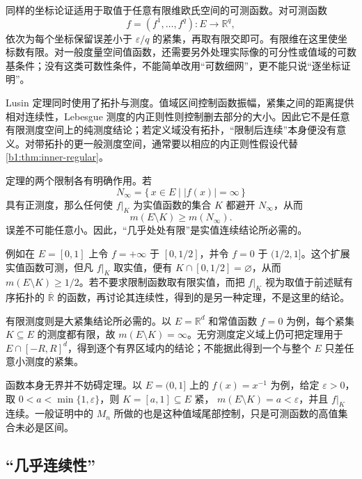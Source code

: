 同样的坐标论证适用于取值于任意有限维欧氏空间的可测函数。对可测函数
\[
  f=(f^1,\ldots,f^q):E\longrightarrow\mathbb R^q,
\]
依次为每个坐标保留误差小于
\(\varepsilon/q\) 的紧集，再取有限交即可。有限维在这里使坐标数有限。对一般度量空间值函数，还需要另外处理实际像的可分性或值域的可数基条件；没有这类可数性条件，不能简单改用“可数细网”，更不能只说“逐坐标证明”。

\ProseParagraphBreak

Lusin 定理同时使用了拓扑与测度。值域区间控制函数振幅，紧集之间的距离提供相对连续性，Lebesgue 测度的内正则性则控制删去部分的大小。因此它不是任意有限测度空间上的纯测度结论；若定义域没有拓扑，“限制后连续”本身便没有意义。对带拓扑的更一般测度空间，通常要以相应的内正则性假设代替%
\cref{b1:thm:inner-regular}。

\ProseParagraphBreak

定理的两个限制各有明确作用。若
\[
N_\infty=\{\,x\in E\mid |f(x)|=\infty\,\}
\]
具有正测度，那么任何使 \(f|_K\) 为实值函数的集合 \(K\) 都避开
\(N_\infty\)，从而
\[
m(E\setminus K)\geq m(N_\infty).
\]
误差不可能任意小。因此，“几乎处处有限”是实值连续结论所必需的。

\ProseParagraphBreak

例如在 \(E=[0,1]\) 上令 \(f=+\infty\) 于 \([0,1/2]\)，并令
\(f=0\) 于 \((1/2,1]\)。这个扩展实值函数可测，但凡
\(f|_K\) 取实值，便有 \(K\cap[0,1/2]=\varnothing\)，从而
\(m(E\setminus K)\geq1/2\)。若不要求限制函数取有限实值，而把
\(f|_K\) 视为取值于前述赋有序拓扑的 \(\overline{\mathbb R}\) 的函数，再讨论其连续性，得到的是另一种定理，不是这里的结论。

\ProseParagraphBreak

有限测度则是大紧集结论所必需的。以 \(E=\mathbb R^d\) 和常值函数
\(f=0\) 为例，每个紧集 \(K\subseteq E\) 的测度都有限，故
\(m(E\setminus K)=\infty\)。无穷测度定义域上仍可把定理用于
\(E\cap[-R,R]^d\)，得到逐个有界区域内的结论；不能据此得到一个与整个 \(E\) 只差任意小测度的紧集。

\ProseParagraphBreak

函数本身无界并不妨碍定理。以 \(E=(0,1]\) 上的 \(f(x)=x^{-1}\) 为例，给定 \(\varepsilon>0\)，取
\(0<a<\min\{1,\varepsilon\}\)，则 \(K=[a,1]\subseteq E\) 紧，
\(m(E\setminus K)=a<\varepsilon\)，并且 \(f|_K\) 连续。一般证明中的
\(M_n\) 所做的也是这种值域尾部控制，只是可测函数的高值集合未必是区间。

\subsection{“几乎连续性”}
\label{b1:subsec:040403}

